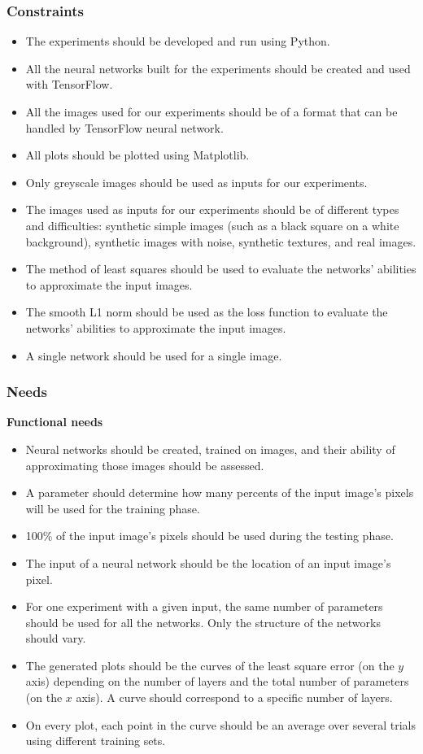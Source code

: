 \documentclass[a4paper]{article}
\begin{document}
\subsubsection{Constraints}
\begin{itemize}
\item The experiments should be developed and run using Python.
\item All the neural networks built for the experiments should be created and used with TensorFlow.
\item All the images used for our experiments should be of a format that can be handled by TensorFlow neural network. 
\item All plots should be plotted using Matplotlib.
\item Only greyscale images should be used as inputs for our experiments.
\item The images used as inputs for our experiments should be of different types and difficulties: synthetic simple images (such as a black square on a white background), synthetic images with noise, synthetic textures, and real images.
\item The method of least squares should be used to evaluate the networks' abilities to approximate the input images.
\item The smooth L1 norm should be used as the loss function to evaluate the networks' abilities to approximate the input images.
\item A single network should be used for a single image.
\end{itemize}

\subsubsection{Needs}
\noindent\textbf{Functional needs}
\begin{itemize}
\item Neural networks should be created, trained on images, and their ability of approximating those images should be assessed. 
\item A parameter should determine how many percents of the input image's pixels will be used for the training phase.
\item 100\% of the input image's pixels should be used during the testing phase.
\item The input of a neural network should be the location of an input image's pixel.
\item For one experiment with a given input, the same number of parameters should be used for all the networks. Only the structure of the networks should vary.
\item The generated plots should be the curves of the least square error (on the $y$ axis) depending on the number of layers and the total number of parameters (on the $x$ axis). A curve should correspond to a specific number of layers.
\item On every plot, each point in the curve should be an average over several trials using different training sets.

\end{itemize}
\end{document}
